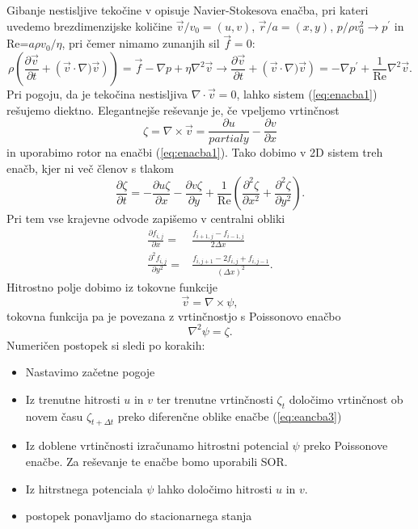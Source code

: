 \documentclass[12pt,a4paper]{article}
\begin{document}
Gibanje nestisljive tekočine v opisuje Navier-Stokesova enačba, pri kateri uvedemo brezdimenzijske količine $\vec{v}/v_0 = (u,v)$, $\vec{r}/a=(x,y)$, $p/\rho v_0 ^{2} \rightarrow p^{\prime}$ in Re=$a\rho v_0/\eta$, pri čemer nimamo zunanjih sil $\vec{f}=0$:
\begin{equation} \label{eq:enacba1}
\rho \left( \frac{\partial \vec{v}}{\partial t} + \left( \vec{v} \cdot \nabla) \vec{v} \right) \right) = \vec{f} - \nabla p + \eta \nabla ^{2} \vec{v} \rightarrow \frac{\partial \vec{v}}{\partial t} +\left(  \vec{v} \cdot \nabla) \vec{v} \right)= -\nabla p ^{\prime} + \frac{1}{\textrm{Re}} \nabla ^{2} \vec{v}.
\end{equation}
Pri pogoju, da je tekočina nestisljiva $\nabla \cdot \vec{v}=0$, lahko sistem (\ref{eq:enacba1}) rešujemo diektno. Elegantnejše reševanje je, če vpeljemo vrtinčnost
\begin{equation} \label{eq:enacba2}
\zeta = \nabla \times \vec{v}= \frac{\partial u}{partial y} - \frac{\partial v}{\partial x}
\end{equation}
in uporabimo rotor na enačbi (\ref{eq:enacba1}). Tako dobimo v 2D sistem treh enačb, kjer ni več členov s tlakom
\begin{equation}\label{eq:eancba3}
\frac{\partial \zeta}{\partial t}= - \frac{\partial u \zeta}{\partial x} - \frac{\partial v \zeta}{\partial y} + \frac{1}{\textrm{Re}}\left( \frac{\partial ^{2} \zeta}{\partial x^{2}} +\frac{\partial ^{2} \zeta}{\partial y^{2}} \right).
\end{equation}
Pri tem vse krajevne odvode zapišemo v centralni obliki
\begin{align}\label{eq:enacba4}
\frac{\partial f_{i,j}}{\partial x}=& \frac{ f_{i+1,j}-f_{i-1,j}}{2\Delta x} \nonumber \\
\frac{\partial ^{2} f_{i,j}}{\partial y^{2}}=& \frac{f_{i,j+1} - 2f_{i,j} + f_{i,j-1}}{(\Delta x) ^{2}}.
\end{align}
Hitrostno polje dobimo iz tokovne funkcije
\begin{equation*}
\vec{v}=\nabla \times \psi,
\end{equation*}
tokovna funkcija pa je povezana z vrtinčnostjo s Poissonovo enačbo
\begin{equation*}
\nabla ^{2} \psi = \zeta.
\end{equation*}
Numeričen postopek si sledi po korakih:
\begin{itemize}
\item Nastavimo začetne pogoje
\item Iz trenutne hitrosti $u$ in $v$ ter trenutne vrtinčnosti $\zeta_t$ določimo vrtinčnost ob novem času $\zeta_{t+\Delta t}$ preko diferenčne oblike enačbe (\ref{eq:eancba3})
\item Iz doblene vrtinčnosti izračunamo hitrostni potencial $\psi$ preko Poissonove enačbe. Za reševanje te enačbe bomo uporabili SOR.
\item Iz hitrstnega potenciala $\psi$ lahko določimo hitrosti $u$ in $v$.
\item postopek ponavljamo do stacionarnega stanja
\end{itemize}
\end{document}

